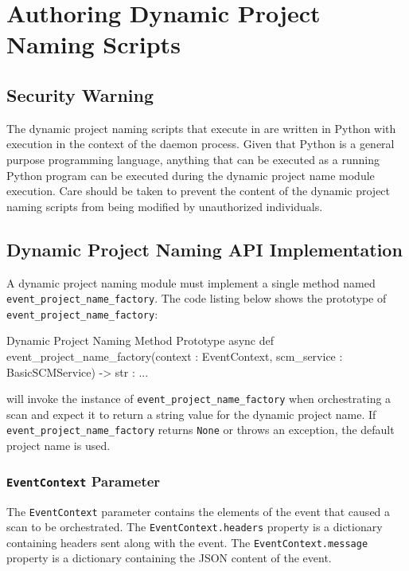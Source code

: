 \section{Authoring Dynamic Project Naming Scripts}

\subsection{Security Warning}

The dynamic project naming scripts that execute in \cxoneflow are written in Python with execution in the context of
the \cxoneflow daemon process.  Given that Python is a general purpose programming language, anything that can be executed
as a running Python program can be executed during the dynamic project name module execution.  Care should be taken to
prevent the content of the dynamic project naming scripts from being modified by unauthorized individuals.

\subsection{Dynamic Project Naming API Implementation}

A dynamic project naming module must implement a single method named \texttt{event\_project\_name\_factory}. The code
listing below shows the prototype of \texttt{event\_project\_name\_factory}:

\begin{code}{Dynamic Project Naming Method Prototype}{}{}
async def event_project_name_factory(context : EventContext, scm_service : BasicSCMService) -> str : ...
\end{code}

\cxoneflow will invoke the instance of \texttt{event\_project\_name\_factory} when orchestrating a scan and expect
it to return a string value for the dynamic project name.  If \texttt{event\_project\_name\_factory} returns \texttt{None}
or throws an exception, the default project name is used.

\subsubsection{\texttt{EventContext} Parameter}

The \texttt{EventContext} parameter contains the elements of the event that caused a scan to be orchestrated.
The \texttt{EventContext.headers} property is a dictionary containing headers sent along with the event.  The
\texttt{EventContext.message} property is a dictionary containing the JSON content of the event.

